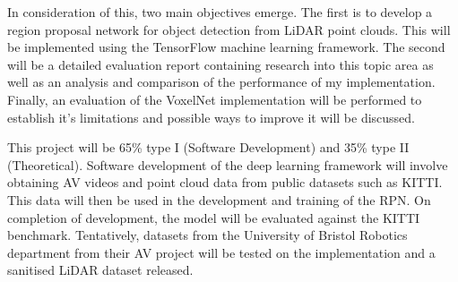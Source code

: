 \begin{SingleSpace}
In consideration of this, two main objectives emerge. The first is to develop a region proposal network for object detection from LiDAR point clouds. This will be implemented using the TensorFlow machine learning framework.
The second will be a detailed evaluation report containing research into this topic area as well as an analysis and comparison of the performance of my implementation. 
Finally, an evaluation of the VoxelNet implementation will be performed to establish it's limitations and possible ways to improve it will be discussed. 

This project will be 65\% type I (Software Development)  and 35\% type II (Theoretical). Software development of the deep learning framework will involve obtaining AV videos and point cloud data from public datasets such as KITTI. This data will then be used in the development and training of the RPN. On completion of development, the model will be evaluated against the KITTI benchmark.
Tentatively, datasets from the University of Bristol Robotics department from their AV project will be tested on the implementation and a sanitised LiDAR dataset released. 


\clearpage

\end{SingleSpace}


